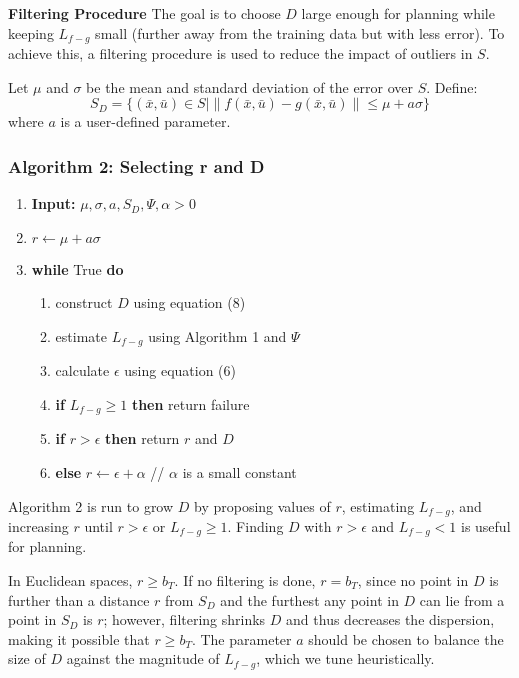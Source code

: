 \documentclass{article}
\begin{document}
\textbf{Filtering Procedure}
The goal is to choose \( D \) large enough for planning while keeping \( L_{f-g} \) small (further away from the training data but with less error). To achieve this, a filtering procedure is used to reduce the impact of outliers in \( S \).

Let \( \mu \) and \( \sigma \) be the mean and standard deviation of the error over \( S \). Define:
\[
S_D = \{(\bar{x}, \bar{u}) \in S \mid \|f(\bar{x}, \bar{u}) - g(\bar{x}, \bar{u})\| \leq \mu + a\sigma\}
\]
where \( a \) is a user-defined parameter.

\subsubsection{Algorithm 2: Selecting r and D}
\begin{enumerate}
    \item \textbf{Input:} \( \mu, \sigma, a, S_D, \Psi, \alpha > 0 \)
    \item \( r \leftarrow \mu + a\sigma \)
    \item \textbf{while} True \textbf{do}
    \begin{enumerate}
        \item construct \( D \) using equation (8)
        \item estimate \( L_{f-g} \) using Algorithm 1 and \( \Psi \)
        \item calculate \( \epsilon \) using equation (6)
        \item \textbf{if} \( L_{f-g} \geq 1 \) \textbf{then} return failure
        \item \textbf{if} \( r > \epsilon \) \textbf{then} return \( r \) and \( D \)
        \item \textbf{else} \( r \leftarrow \epsilon + \alpha \) // \( \alpha \) is a small constant
    \end{enumerate}
\end{enumerate}

Algorithm 2 is run to grow \( D \) by proposing values of \( r \), estimating \( L_{f-g} \), and increasing \( r \) until \( r > \epsilon \) or \( L_{f-g} \geq 1 \). Finding \( D \) with \( r > \epsilon \) and \( L_{f-g} < 1 \) is useful for planning.

In Euclidean spaces, \( r \geq b_T \). If no filtering is done, \( r = b_T \), since no point in \( D \) is further than a distance \( r \) from \( S_D \) and the furthest any point in \( D \) can lie from a point in \( S_D \) is \( r \); however, filtering shrinks \( D \) and thus decreases the dispersion, making it possible that \( r \geq b_T \). The parameter \( a \) should be chosen to balance the size of \( D \) against the magnitude of \( L_{f-g} \), which we tune heuristically.
\end{document}
